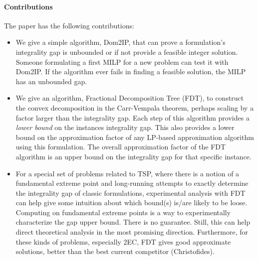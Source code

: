\paragraph{Contributions}  The paper has the following contributions: 
\begin{itemize}
\item We give a simple algorithm, Dom2IP, that can prove a formulation’s integrality gap is unbounded or if not provide a feasible integer solution.  Someone formulating a first MILP for a new problem can test it with Dom2IP.  If the algorithm ever fails in finding a feasible solution, the MILP has an unbounded gap.
\item We give an algorithm, Fractional Decomposition Tree (FDT), to construct the convex decomposition in the Carr-Vempala theorem, perhaps scaling by a factor larger than the integrality gap.  Each step of this algorithm provides a {\em lower bound} on the instances integrality gap. This also provides a lower bound on the approximation factor of any LP-based approximation algorithm using this formulation. The overall approximation factor of the FDT algorithm is an upper bound on the integrality gap for that specific instance.
\item For a special set of problems related to TSP, where there is a notion of a fundamental extreme point and long-running attempts to exactly determine the integrality gap of classic formulations, experimental analysis with FDT can help give some intuition about which bound(s) is/are likely to be loose.  Computing on fundamental extreme points is a way to experimentally characterize the gap upper bound.  There is no guarantee. Still, this can help direct theoretical analysis in the most promising direction.  Furthermore, for these kinds of problems, especially 2EC, FDT gives good approximate solutions, better than the best current competitor (Christofides).
\end{itemize}


